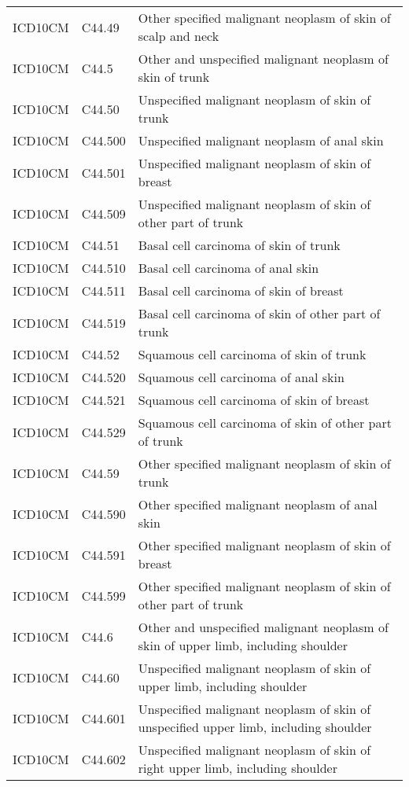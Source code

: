 \begin{table}[ht]
\begin{tabular}{lll}
  ICD10CM & C44.49 & Other specified malignant neoplasm of skin of scalp and neck \\ 
  ICD10CM & C44.5 & Other and unspecified malignant neoplasm of skin of trunk \\ 
  ICD10CM & C44.50 & Unspecified malignant neoplasm of skin of trunk \\ 
  ICD10CM & C44.500 & Unspecified malignant neoplasm of anal skin \\ 
  ICD10CM & C44.501 & Unspecified malignant neoplasm of skin of breast \\ 
  ICD10CM & C44.509 & Unspecified malignant neoplasm of skin of other part of trunk \\ 
  ICD10CM & C44.51 & Basal cell carcinoma of skin of trunk \\ 
  ICD10CM & C44.510 & Basal cell carcinoma of anal skin \\ 
  ICD10CM & C44.511 & Basal cell carcinoma of skin of breast \\ 
  ICD10CM & C44.519 & Basal cell carcinoma of skin of other part of trunk \\ 
  ICD10CM & C44.52 & Squamous cell carcinoma of skin of trunk \\ 
  ICD10CM & C44.520 & Squamous cell carcinoma of anal skin \\ 
  ICD10CM & C44.521 & Squamous cell carcinoma of skin of breast \\ 
  ICD10CM & C44.529 & Squamous cell carcinoma of skin of other part of trunk \\ 
  ICD10CM & C44.59 & Other specified malignant neoplasm of skin of trunk \\ 
  ICD10CM & C44.590 & Other specified malignant neoplasm of anal skin \\ 
  ICD10CM & C44.591 & Other specified malignant neoplasm of skin of breast \\ 
  ICD10CM & C44.599 & Other specified malignant neoplasm of skin of other part of trunk \\ 
  ICD10CM & C44.6 & Other and unspecified malignant neoplasm of skin of upper limb, including shoulder \\ 
  ICD10CM & C44.60 & Unspecified malignant neoplasm of skin of upper limb, including shoulder \\ 
  ICD10CM & C44.601 & Unspecified malignant neoplasm of skin of unspecified upper limb, including shoulder \\ 
  ICD10CM & C44.602 & Unspecified malignant neoplasm of skin of right upper limb, including shoulder \\ 

\end{tabular}
\end{table}
